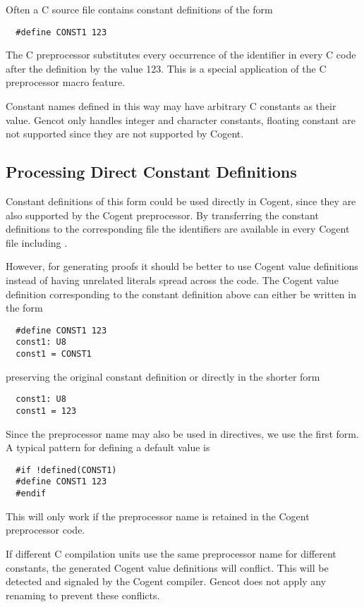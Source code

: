 Often a C source file contains constant definitions of the form
\begin{verbatim}
  #define CONST1 123
\end{verbatim}
The C preprocessor substitutes every occurrence of the identifier  in every C code after the definition 
by the value 123. This is a special application of the C preprocessor macro feature.

Constant names defined in this way may have arbitrary C constants as their value. Gencot only handles integer and
character constants, floating constant are not supported since they are not supported by Cogent.

\subsection{Processing Direct Constant Definitions}

Constant definitions of this form could be used directly in Cogent, since they are also supported by the Cogent preprocessor.
By transferring the constant definitions to the corresponding file  the identifiers are available
in every Cogent file including . 

However, for generating proofs it should be better to use Cogent value definitions instead of having unrelated 
literals spread across the code. The Cogent value definition corresponding to the constant definition above can either 
be written in the form
\begin{verbatim}
  #define CONST1 123
  const1: U8
  const1 = CONST1
\end{verbatim}
preserving the original constant definition or directly in the shorter form
\begin{verbatim}
  const1: U8
  const1 = 123
\end{verbatim}
Since the preprocessor name  may also be used in  directives, we use the first form. A typical pattern 
for defining a default value is
\begin{verbatim}
  #if !defined(CONST1)
  #define CONST1 123
  #endif
\end{verbatim}
This will only work if the preprocessor name is retained in the Cogent preprocessor code.

If different C compilation units use the same preprocessor name for different constants, the generated Cogent value definitions
will conflict. This will be detected and signaled by the Cogent compiler. Gencot does not apply any renaming to prevent these
conflicts.

